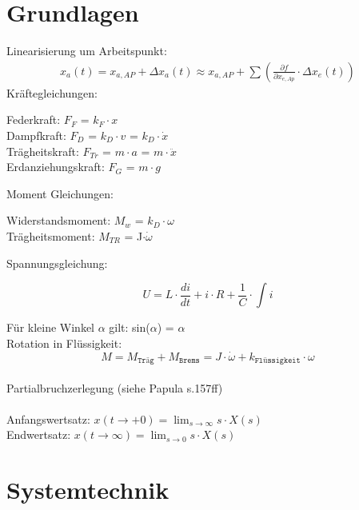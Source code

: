 \documentclass[10pt,a4paper]{article}
\begin{document}
\twocolumn
\pagestyle{fancy}
\cfoot{\vspace{-20pt}\thepage}

\section{Grundlagen}
Linearisierung um Arbeitspunkt:
\begin{align*}
	x_{a}(t)=x_{a,AP}+\Delta x_{a}(t) \approx x_{a,AP}+\sum\left(\frac{\partial f}
	{\partial x_{e,Ap}} \cdot \Delta x_{e}(t)\right)
\end{align*}
Kräftegleichungen:
\begin{mdframed}[style=exercise]
	Federkraft: $F_F$ = $k_F \cdot x$\\
	Dampfkraft: $F_D$ = $k_D \cdot v$ = $k_D \cdot \dot{x}$\\
	Trägheitskraft: $F_{Tr}$ = $m\cdot a$ = $m\cdot \ddot{x}$\\
	Erdanziehungskraft: $F_G$ = $m\cdot g$
\end{mdframed}
Moment Gleichungen:
\begin{mdframed}[style=exercise]
	Widerstandsmoment: $M_w$ = $k_D \cdot \omega$\\
	Trägheitsmoment: $M_{TR}$ = J$\cdot \dot{\omega}$
\end{mdframed}
Spannungsgleichung:
\begin{mdframed}[style=exercise]
	\[
		U = L\cdot \frac{di}{dt}+i\cdot R+\frac{1}{C} \cdot \int i
	\]
\end{mdframed}
Für kleine Winkel $\alpha$ gilt: sin($\alpha$) = $\alpha$\\
Rotation in Flüssigkeit:
\[
	M=M_{\texttt{Träg}}+M_{\texttt{Brems}}=J \cdot \dot{\omega} +k_{\texttt{Flüssigkeit}} \cdot \omega
\]\\
Partialbruchzerlegung (siehe Papula s.157ff)\\
\\
Anfangswertsatz: $x(t \rightarrow +0)=\lim _{s \rightarrow \infty} s \cdot X(s)$\\
Endwertsatz: $x(t \rightarrow \infty)=\lim _{s \rightarrow 0} s \cdot X(s)$
\section{Systemtechnik}
\end{document}
